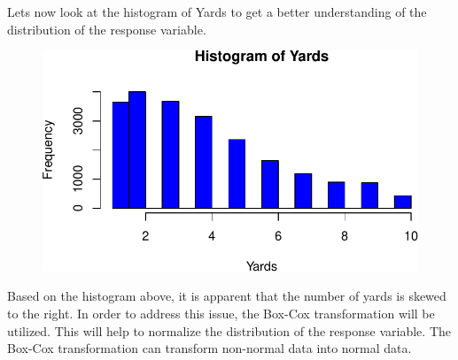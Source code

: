 \documentclass[
  super,
  preprint,
  3p]{elsarticle}
\newenvironment{Shaded}{\begin{snugshade}}{\end{snugshade}}
\newcommand{\AttributeTok}[1]{\textcolor[rgb]{0.40,0.45,0.13}{#1}}
\newcommand{\CommentTok}[1]{\textcolor[rgb]{0.37,0.37,0.37}{#1}}
\newcommand{\DecValTok}[1]{\textcolor[rgb]{0.68,0.00,0.00}{#1}}
\newcommand{\FunctionTok}[1]{\textcolor[rgb]{0.28,0.35,0.67}{#1}}
\newcommand{\NormalTok}[1]{\textcolor[rgb]{0.00,0.23,0.31}{#1}}
\newcommand{\OtherTok}[1]{\textcolor[rgb]{0.00,0.23,0.31}{#1}}
\newcommand{\SpecialCharTok}[1]{\textcolor[rgb]{0.37,0.37,0.37}{#1}}
\newcommand{\StringTok}[1]{\textcolor[rgb]{0.13,0.47,0.30}{#1}}
\begin{document}
\begin{Shaded}
\end{Shaded}

Lets now look at the histogram of Yards to get a better understanding of
the distribution of the response variable.

\begin{Shaded}
\end{Shaded}

\begin{figure}[H]

{\centering \includegraphics{project_report_files/figure-pdf/unnamed-chunk-21-1.pdf}

}

\end{figure}

Based on the histogram above, it is apparent that the number of yards is
skewed to the right. In order to address this issue, the Box-Cox
transformation will be utilized. This will help to normalize the
distribution of the response variable. The Box-Cox transformation can
transform non-normal data into normal data.
\end{document}
